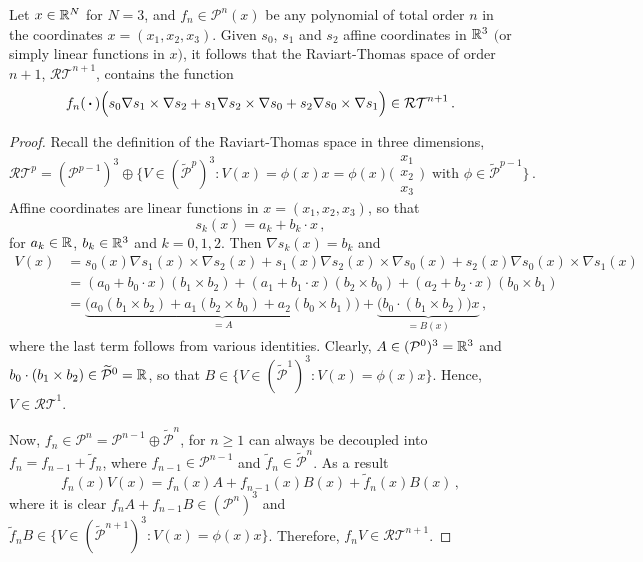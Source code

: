 \begin{lemma}
\label{lemma:div}
Let $x\in\mathbb{R}^N$ for $N=3$, and $f_n\in\mathcal{P}^n(x)$ be any polynomial of total order $n$ in the coordinates $x=(x_1,x_2,x_3)$. Given $s_0$, $s_1$ and $s_2$ affine coordinates in $\mathbb{R}^3$ $($or simply linear functions in $x$$)$, it follows that the Raviart-Thomas space of order $n+1$, $\mathcal{RT}^{n+1}$, contains the function 
\begin{equation*}
	f_n(\,\boldsymbol{\cdot}\,)\Big(s_0\nabla s_1\times\nabla s_2+s_1\nabla s_2\times\nabla s_0+s_2\nabla s_0\times\nabla s_1\Big)\in\mathcal{RT}^{n+1}\,.
\end{equation*}
\end{lemma}
\begin{proof}
Recall the definition of the Raviart-Thomas space in three dimensions,
\begin{equation*}
	\mathcal{RT}^p=(\mathcal{P}^{p-1})^3\oplus\Big\{V\in(\tilde{\mathcal{P}}^{p})^3:V(x)=\phi(x)x
		=\phi(x)\Big(\begin{smallmatrix}x_1\\x_2\\x_3\end{smallmatrix}\Big) \, \text{ with }\phi\in\tilde{\mathcal{P}}^{p-1}\Big\}\,.
\end{equation*}
Affine coordinates are linear functions in $x=(x_1,x_2,x_3)$, so that
\begin{equation*}
	s_k(x)=a_k+b_k\cdot x\,,
\end{equation*}
for $a_k\in\mathbb{R}$, $b_k\in\mathbb{R}^3$ and $k=0,1,2$. Then $\nabla s_k(x)=b_k$ and
\begin{align*}
	V(x)&=s_0(x)\nabla s_1(x)\times\nabla s_2(x)+s_1(x)\nabla s_2(x)\times\nabla s_0(x)+s_2(x)\nabla s_0(x)\times\nabla s_1(x)\\
		&=(a_0+b_0\cdot x)(b_1\times b_2)+(a_1+b_1\cdot x)(b_2\times b_0)+(a_2+b_2\cdot x)(b_0\times b_1)\\
		&=\underbrace{\Big(a_0(b_1\times b_2)+a_1(b_2\times b_0)+a_2(b_0\times b_1)\Big)}_{=A}
			+\underbrace{\Big(b_0\cdot(b_1\times b_2)\Big)x}_{=B(x)}\,,			
\end{align*}
where the last term follows from various identities. Clearly, $A\in(\mathcal{P}^0)^3=\mathbb{R}^3$ and $b_0\cdot(b_1\times b_2)\in\widetilde{\mathcal{P}}^0=\mathbb{R}$, so that $B\in\{V\in(\tilde{\mathcal{P}}^{1})^3: V(x)=\phi(x)x\}$. Hence, $V\in\mathcal{RT}^1$.

Now, $f_n\in\mathcal{P}^n=\mathcal{P}^{n-1}\oplus\tilde{\mathcal{P}}^n$, for $n\geq1$ can always be decoupled into $f_n=f_{n-1}+\tilde{f}_n$, where $f_{n-1}\in\mathcal{P}^{n-1}$ and $\tilde{f}_n\in\tilde{\mathcal{P}}^n$. As a result
\begin{equation*}
	f_n(x)V(x)=f_n(x)A+f_{n-1}(x)B(x)+\tilde{f}_n(x)B(x)\,,
\end{equation*}
where it is clear $f_{n}A+f_{n-1}B\in(\mathcal{P}^n)^3$ and $\tilde{f}_nB\in\{V\in(\tilde{\mathcal{P}}^{n+1})^3: V(x)=\phi(x)x\}$. Therefore, $f_nV\in\mathcal{RT}^{n+1}$.
\end{proof}


